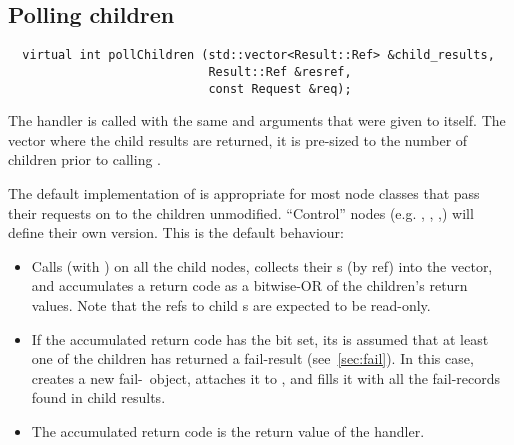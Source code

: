 \subsection{Polling children}
    

  \begin{verbatim}    
  virtual int pollChildren (std::vector<Result::Ref> &child_results,
                            Result::Ref &resref,
                            const Request &req);
  \end{verbatim}
    
  \noindent The handler is called with the same  and 
  arguments  that were given to  itself. The
   vector where the child results are returned, it is
  pre-sized to the number of children prior to calling .

  The default implementation of  is appropriate for most
  node classes that pass their requests on to the children unmodified. 
  ``Control'' nodes (e.g. , , ,) will
  define their own version. This is the default 
  behaviour:

  \begin{itemize}

  \item Calls  (with ) on all the child nodes, collects
  their \Result{}s (by ref) into the  vector, and
  accumulates a return code as a bitwise-OR of the children's 
  return values. Note that the refs to child \Result{}s are expected to
  be read-only. 

  \item If the accumulated return code has the  bit set, its is
  assumed that at least one of the children has returned a fail-result
  (see~\ref{sec:fail}). In this case,  creates a new
  fail-\Result\ object, attaches it to , and fills it with 
  all the fail-records found in child results.

  \item The accumulated return code is the return value of the handler.

  \end{itemize}
  
